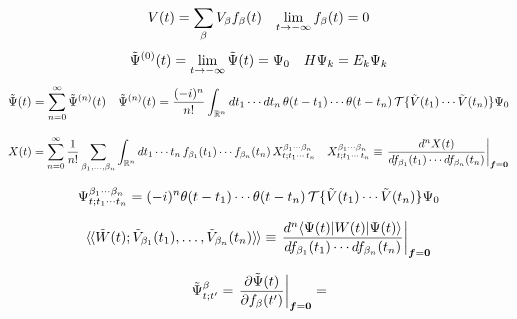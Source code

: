 \documentclass[11pt]{article}
\numberwithin{equation}{section}
\begin{document}
\begin{rmk}
\begin{align}
  V(t)
=
  \sum_{\beta }
  V_{\beta }
  f_{\beta }(t)
&&
  \lim_{t\rightarrow-\infty}
  f_{\beta }(t)
=
  0
\end{align}
\begin{align}
  \tilde{\Psi }^{(0)}(t)
=
  \lim_{t\rightarrow-\infty}
  \tilde{\Psi }(t)
=
  \Psi _0
&&
  H
  \Psi _k
=
  E_k
  \Psi _k
\end{align}
\begin{align}
  \tilde{\Psi }(t)
=
  \sum_{n=0}^\infty
  \tilde{\Psi }^{(n)}(t)
&&
  \tilde{\Psi }^{(n)}(t)
=
  \frac {(-i)^n}{n!}
  \int_{\mathbb{R}^n}
  dt_1\cdots dt_n\,
  \theta (t-t_1)
  \cdots
  \theta (t-t_n)\,
  \mathcal{T}\{
    \tilde{V}(t_1)
    \cdots
    \tilde{V}(t_n)
  \}
  \Psi _0
\end{align}
\end{rmk}

\begin{dfn}
\begin{align}
  X(t)
=
  \sum_{n=0}^\infty
  \fr{1}{n!}
  \sum_{\b_1,\ld,\b_n}
  \int_{\mb{R}^n}
  dt_1\cd t_n\,
  f_{\b_1}(t_1)
  \cd
  f_{\b_n}(t_n)\,
  X^{\b_1\cd \b_n}_{t;t_1\cd\,t_n}
&&
  X^{\b_1\cd \b_n}_{t;t_1\cd\,t_n}
\equiv
  \left.
  \fd{^n
    X(t)
  }{
    f_{\b_1}(t_1)
    \cd
    df_{\b_n}(t_n)
  }
  \right|_{\bm{f}=\bo{0}}
\end{align}
\end{dfn}

\begin{prop}
\begin{align}
  \Psi ^{\beta _1\cdots \beta _n}_{t; t_1\cdots t_n}
=
  (-i)^n
  \theta (t-t_1)
  \cdots
  \theta (t-t_n)\,
  \mathcal{T}\{
    \tilde{V}(t_1)
  \cdots
    \tilde{V}(t_n)
  \}
  \Psi _0
\end{align}
\end{prop}

\begin{ntt}
\begin{align}
  \iip{\tl{W}(t); \tl{V}_{\b_1}(t_1),\ld,\tl{V}_{\b_n}(t_n)}
\equiv
  \left.
  \fd{^n
    \ip{\Y(t)|W(t)|\Y(t)}
  }{
    f_{\b_1}(t_1)
    \cd
    df_{\b_n}(t_n)
  }
  \right|_{\bm{f}=\bo{0}}
\end{align}
\end{ntt}

\begin{ex}
\begin{align}
  \tl{\Y}^{\b}_{t;t'}
=
  \left.
  \pd{\tl{\Y}(t)}{f_\b(t')}
  \right|_{\bm{f}=\bo{0}}
=
\end{align}
\end{ex}
\end{document}
